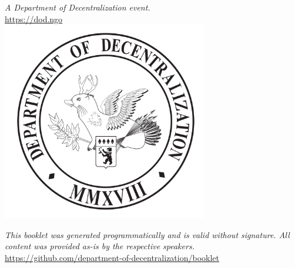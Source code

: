\newpage
\thispagestyle{plain}
\mbox{}
\newpage
\cleardoublepage
\begin{center}
  \thispagestyle{empty}
  \shipout\null
  \noindent
  \textit{\small A Department of Decentralization event.}\\
  \underline{\small https://dod.ngo}\\[3em]

  \includegraphics[width=0.67\textwidth]{wolpy.pdf}\\[1em]

  \vspace{\fill}

  \noindent\textit{\small This booklet was generated programmatically and is valid
  without signature. All content was provided as-is by the respective speakers.}\\[1em]
  \underline{\small https://github.com/department-of-decentralization/booklet}
\end{center}
